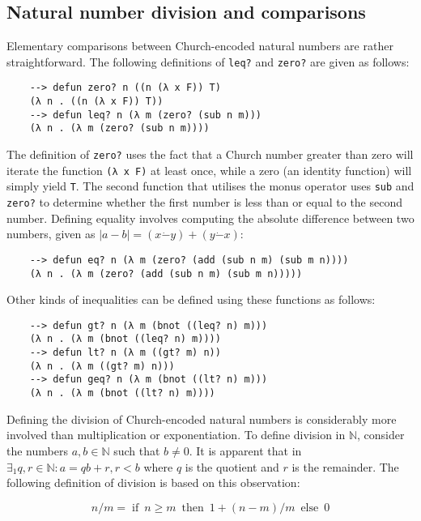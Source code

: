 \subsection{Natural number division and comparisons}

Elementary comparisons between Church-encoded natural numbers are rather straightforward. The following definitions of \verb|leq?| and \verb|zero?| are given as follows:

\begin{Verbatim}
    --> defun zero? n ((n (λ x F)) T)
    (λ n . ((n (λ x F)) T))
    --> defun leq? n (λ m (zero? (sub n m)))
    (λ n . (λ m (zero? (sub n m))))
\end{Verbatim}

The definition of \verb|zero?| uses the fact that a Church number greater than zero will iterate the function \verb|(λ x F)| at least once, while a zero (an identity function) will simply yield \verb|T|. The second function that utilises the monus operator uses \verb|sub| and \verb|zero?| to determine whether the first number is less than or equal to the second number. Defining equality involves computing the absolute difference between two numbers, given as $|a - b| = (x{ \dot -}y) + (y{ \dot -}x)$:

\begin{Verbatim}
    --> defun eq? n (λ m (zero? (add (sub n m) (sub m n))))
    (λ n . (λ m (zero? (add (sub n m) (sub m n)))))
\end{Verbatim}

Other kinds of inequalities can be defined using these functions as follows:

\begin{Verbatim}
    --> defun gt? n (λ m (bnot ((leq? n) m)))
    (λ n . (λ m (bnot ((leq? n) m))))
    --> defun lt? n (λ m ((gt? m) n))
    (λ n . (λ m ((gt? m) n)))
    --> defun geq? n (λ m (bnot ((lt? n) m)))
    (λ n . (λ m (bnot ((lt? n) m))))
\end{Verbatim}

Defining the division of Church-encoded natural numbers is considerably more involved than multiplication or exponentiation. To define division in $\mathbb{N}$, consider the numbers $a,b\in\mathbb{N}$ such that $b\ne 0$. It is apparent that in ${\displaystyle \exists_1 q, r \in \mathbb{N}: a = q b + r, r < b}$ where $q$ is the quotient and $r$ is the remainder. The following definition of division is based on this observation:

$$
n/m=\operatorname {if} \ n\geq m\ \operatorname {then} \ 1+(n-m)/m\ \operatorname {else} \ 0
$$

